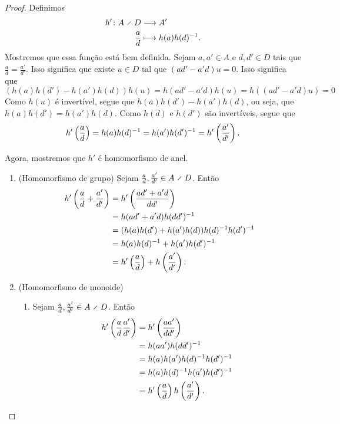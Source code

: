 \begin{proof} Definimos
	\begin{align*}
	\func{h'}{A \olddiv D}{A'}{\frac{a}{d}}{h(a)h(d)\inv}.
	\end{align*}
Mostremos que essa função está bem definida. Sejam $a,a' \in A$ e $d,d' \in D$ tais que $\frac{a}{d} = \frac{a'}{d'}$. Isso significa que existe $u \in D$ tal que $(ad'-a'd)u = 0$. Isso significa que
	\begin{equation*}
	(h(a)h(d')-h(a')h(d)) h(u) = h(ad'-a'd)h(u) = h((ad'-a'd)u) = 0
	\end{equation*}
Como $h(u)$ é invertível, segue que $h(a)h(d')-h(a')h(d)$, ou seja, que $h(a)h(d') = h(a')h(d)$. Como $h(d)$ e $h(d')$ são invertíveis, segue que
	\begin{equation*}
	h'\left( \frac{a}{d} \right) = h(a)h(d)^{-1} = h(a')h(d')^{-1} = h'\left( \frac{a'}{d'} \right).
	\end{equation*}

Agora, mostremos que $h'$ é homomorfismo de anel.
	\begin{enumerate}
	\item (Homomorfismo de grupo) Sejam $\frac{a}{d},\frac{a'}{d'} \in A \olddiv D$. Então
		\begin{align*}
		h' \left( \frac{a}{d} + \frac{a'}{d'} \right) &= h' \left( \frac{ad'+a'd}{dd'} \right) \\
			&= h(ad'+a'd)h(dd')^{-1} \\
			&= (h(a)h(d')+h(a')h(d)) h(d)^{-1} h(d')^{-1} \\
			&= h(a)h(d)^{-1} + h(a')h(d')^{-1} \\
			&= h' \left( \frac{a}{d} \right) + h \left( \frac{a'}{d'} \right).
		\end{align*}
	
	\item (Homomorfismo de monoide)
		\begin{enumerate}
		\item Sejam $\frac{a}{d},\frac{a'}{d'} \in A \olddiv D$. Então
		\begin{align*}
		h' \left( \frac{a}{d}\frac{a'}{d'} \right) &= h' \left( \frac{aa'}{dd'} \right) \\
			&= h(aa')h(dd')^{-1} \\
			&= h(a)h(a')h(d)^{-1} h(d')^{-1} \\
			&= h(a)h(d)^{-1} h(a')h(d')^{-1} \\
			&= h' \left( \frac{a}{d} \right) h \left( \frac{a'}{d'} \right).
		\end{align*}
		

\end{enumerate}
\end{enumerate}
\end{proof}

